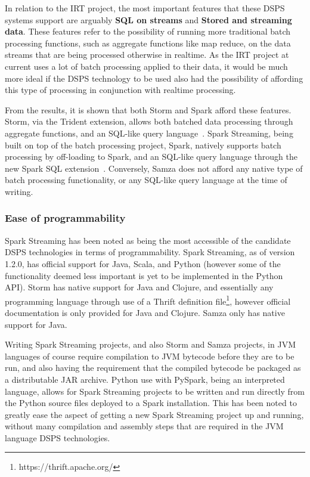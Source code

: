 In relation to the IRT project, the most important features that these DSPS systems support are arguably \textbf{SQL on
streams} and \textbf{Stored and streaming data}. These features refer to the possibility of running more traditional
batch processing functions, such as aggregate functions like map reduce, on the data streams that are being processed
otherwise in realtime. As the IRT project at current uses a lot of batch processing applied to their data, it would be
much more ideal if the DSPS technology to be used also had the possibility of affording this type of processing in
conjunction with realtime processing.

From the results, it is shown that both Storm and Spark afford these features.
Storm, via the Trident extension, allows both batched data processing through aggregate functions, and an SQL-like query
language~\cite{web:storm-trident}. Spark Streaming, being built on top of the batch processing project, Spark, natively
supports batch processing by off-loading to Spark, and an SQL-like query language through the new Spark SQL extension~\cite{web:sparksql}.
Conversely, Samza does not afford any native type of batch processing functionality, or any SQL-like query language at
the time of writing.


\subsubsection{Ease of programmability}

Spark Streaming has been noted as being the most accessible of the candidate DSPS technologies in terms of programmability.
Spark Streaming, as of version 1.2.0, has official support for Java, Scala, and Python (however some of the functionality deemed
less important is yet to be implemented in the Python API). Storm has native support for Java and Clojure, and essentially
any programming language through use of a Thrift definition file\footnote{https://thrift.apache.org/}, however official
documentation is only provided for Java and Clojure. Samza only has native support for Java.

Writing Spark Streaming projects, and also Storm and Samza projects,
in JVM languages of course require compilation to JVM bytecode before they are to be run, and also having the requirement
that the compiled bytecode be packaged as a distributable JAR archive. Python use with PySpark, being an
interpreted language, allows for Spark Streaming projects to be written and run directly from the Python source files
deployed to a Spark installation. This has been noted to greatly ease the aspect of getting a new Spark Streaming project
up and running, without many compilation and assembly steps that are required in the JVM language DSPS technologies.

